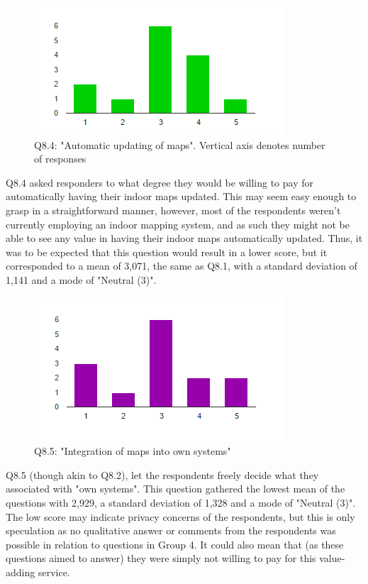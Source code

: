 \begin{figure}
\centering
\includegraphics{figs/q84.PNG}
\caption{Q8.4: "Automatic updating of maps". Vertical axis denotes number of responses}
\label{fig:q84}
\end{figure}
Q8.4 asked responders to what degree they would be willing to pay for automatically having their indoor maps updated. This may seem easy enough to grasp in a straightforward manner, however, most of the respondents weren't currently employing an indoor mapping system, and as such they might not be able to see any value in having their indoor maps automatically updated. Thus, it was to be expected that this question would result in a lower score, but it corresponded to a mean of 3,071, the same as Q8.1, with a standard deviation of 1,141 and a mode of "Neutral (3)". 
\begin{figure}
\centering
\includegraphics{figs/q85.PNG}
\caption{Q8.5: "Integration of maps into own systems"}
\label{fig:q85}
\end{figure}
Q8.5 (though akin to Q8.2), let the respondents freely decide what they associated with "own systems". This question gathered the lowest mean of the questions with 2,929, a standard deviation of 1,328 and a mode of "Neutral (3)". The low score may indicate privacy concerns of the respondents, but this is only speculation as no qualitative answer or comments from the respondents was possible in relation to questions in Group 4. It could also mean that (as these questions aimed to answer) they were simply not willing to pay for this value-adding service.

